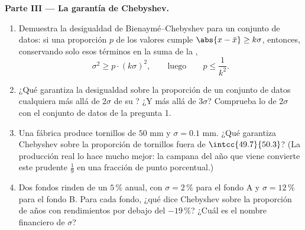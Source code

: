 \begin{problem}
\medskip
\noindent\textbf{Parte III --- La garantía de Chebyshev.}
\begin{enumerate}[resume]
  \item Demuestra la desigualdad de Bienaymé--Chebyshev para un conjunto
        de datos: si una proporción $p$ de los valores cumple
        $\abs{x - \bar x} \geq k\sigma$, entonces, conservando solo esos
        términos en la suma de la ,
        \[
        \sigma^2 \geq p \cdot (k\sigma)^2,
        \qquad\text{luego}\qquad
        p \leq \frac{1}{k^2} .
        \]
  \item ¿Qué garantiza la desigualdad sobre la proporción de un conjunto
        de datos cualquiera más allá de $2\sigma$ de su ? ¿Y más allá
        de $3\sigma$? Comprueba lo de $2\sigma$ con el conjunto de datos
        de la pregunta 1.
  \item Una fábrica produce tornillos de  $50$ mm y
        $\sigma = 0.1$ mm. ¿Qué garantiza Chebyshev sobre la proporción de
        tornillos fuera de $\intcc{49.7}{50.3}$? (La producción real lo
        hace mucho mejor: la campana del año que viene convierte este
        prudente $\frac19$ en una fracción de punto porcentual.)
  \item Dos fondos rinden de  un $5\,\%$ anual, con $\sigma = 2\,\%$
        para el fondo A y $\sigma = 12\,\%$ para el fondo B. Para cada
        fondo, ¿qué dice Chebyshev sobre la proporción de años con
        rendimientos por debajo del $-19\,\%$? ¿Cuál es el nombre
        financiero de $\sigma$?
\end{enumerate}


\end{problem}
